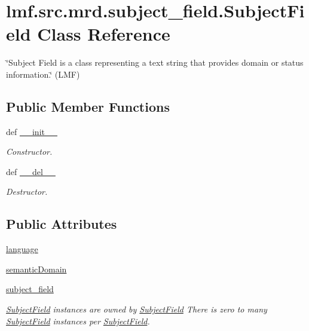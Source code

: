 \hypertarget{classlmf_1_1src_1_1mrd_1_1subject__field_1_1_subject_field}{\section{lmf.\+src.\+mrd.\+subject\+\_\+field.\+Subject\+Field Class Reference}
\label{classlmf_1_1src_1_1mrd_1_1subject__field_1_1_subject_field}
}


\char`\"{}\+Subject Field is a class representing a text string that provides domain or status information.\char`\"{} (L\+M\+F)  


\subsection*{Public Member Functions}
\begin{DoxyCompactItemize}
\item 
def \hyperlink{classlmf_1_1src_1_1mrd_1_1subject__field_1_1_subject_field_a2d8f602d6bb1db753cac9f281c6ffc57}{\+\_\+\+\_\+init\+\_\+\+\_\+}
\begin{DoxyCompactList}\small\item\em Constructor. \end{DoxyCompactList}\item 
def \hyperlink{classlmf_1_1src_1_1mrd_1_1subject__field_1_1_subject_field_a15083c8ac78c8bd835dde95185af506e}{\+\_\+\+\_\+del\+\_\+\+\_\+}
\begin{DoxyCompactList}\small\item\em Destructor. \end{DoxyCompactList}\end{DoxyCompactItemize}
\subsection*{Public Attributes}
\begin{DoxyCompactItemize}
\item 
\hyperlink{classlmf_1_1src_1_1mrd_1_1subject__field_1_1_subject_field_a32aad0bdc68774dbcc308df9bd73a00b}{language}
\item 
\hyperlink{classlmf_1_1src_1_1mrd_1_1subject__field_1_1_subject_field_aa625fa1b644690d878091eaa4ea9460f}{semantic\+Domain}
\item 
\hyperlink{classlmf_1_1src_1_1mrd_1_1subject__field_1_1_subject_field_ae43454d43d98b42b780661e8b18f89d4}{subject\+\_\+field}
\begin{DoxyCompactList}\small\item\em \hyperlink{classlmf_1_1src_1_1mrd_1_1subject__field_1_1_subject_field}{Subject\+Field} instances are owned by \hyperlink{classlmf_1_1src_1_1mrd_1_1subject__field_1_1_subject_field}{Subject\+Field} There is zero to many \hyperlink{classlmf_1_1src_1_1mrd_1_1subject__field_1_1_subject_field}{Subject\+Field} instances per \hyperlink{classlmf_1_1src_1_1mrd_1_1subject__field_1_1_subject_field}{Subject\+Field}. \end{DoxyCompactList}\end{DoxyCompactItemize}


